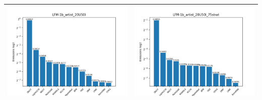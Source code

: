 \begin{table}[H]
    \centering
    \footnotesize
    \setlength\tabcolsep{0pt}
    \begin{tabularx}{\textwidth}{|X|X|}
        \hline
        \includegraphics[width=\linewidth, trim=0 0 0 0]{images/emissions_LFM-1b_artist_20U50I.png} &
        \includegraphics[width=\linewidth, trim=0 0 0 0]{images/emissions_LFM-1b_artist_20U50I_75strat.png} \\
        \hline

\end{tabularx}
\end{table}
